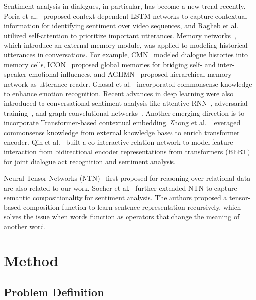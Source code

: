 \documentclass[journal]{IEEEtran}
\begin{document}
Sentiment analysis in dialogues, in particular, has become a new trend recently. Poria et al.~\cite{poria2017context} proposed context-dependent LSTM networks to capture contextual information for identifying sentiment over video sequences, and Ragheb et al.~\cite{ragheb2019attention} utilized self-attention to prioritize important utterances.
Memory networks~\cite{sukhbaatar2015end}, which introduce an external memory module, was applied to modeling historical utterances in conversations. For example, CMN~\cite{hazarika2018conversational} modeled dialogue histories into memory cells, ICON~\cite{hazarika2018icon} proposed global memories for bridging self- and inter-speaker emotional influences, and AGHMN~\cite{jiao2019real} proposed hierarchical memory network as utterance reader.
{Ghosal et al.~\cite{ghosal2020cosmic} incorporated commonsense knowledge to enhance emotion recognition.} 
Recent advances in deep learning were also introduced to conversational sentiment analysis like attentive RNN~\cite{majumder2019dialoguernn}, adversarial training~\cite{wang2019capturing}, and graph convolutional networks~\cite{ghosal2019dialoguegcn}.
Another emerging direction is to incorporate Transformer-based contextual embedding.
Zhong et al.~\cite{zhong2019knowledge} leveraged commonsense knowledge from external knowledge bases to enrich transformer encoder. 
Qin et al.~\cite{qin2020dcr} built a co-interactive relation network to model feature interaction from bidirectional encoder representations from transformers (BERT) for joint dialogue act recognition and sentiment analysis. 


Neural Tensor Networks (NTN)~\cite{socher2013reasoning} first proposed for reasoning over relational data are also related to our work. Socher et al.~\cite{socher2013recursive} further extended NTN to capture semantic compositionality for sentiment analysis. The authors proposed a tensor-based composition function to learn sentence representation recursively, which solves the issue when words function as operators that change the meaning of another word. 




\section{Method}
\label{sec:method}
\subsection{Problem Definition}
\end{document}
